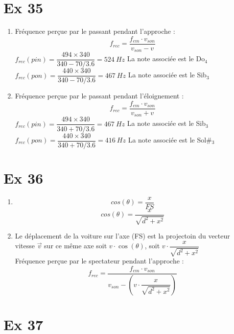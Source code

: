 \documentclass[a4paper,11pt,fleqn]{article}%
\begin{document}
\maketitle

\section*{Ex 35} 

\begin{enumerate}
	\item Fréquence perçue par le passant pendant l'approche : $$f_{rec} = \dfrac{f_{em}\cdot v_{son}}{v_{son}-v}$$
 $f_{rec}(pin) = \dfrac{494\times 340}{340-70/3.6} = \SI{524}{Hz}$ La note associée est le Do$_4$\\
$f_{rec}(pon) = \dfrac{440\times 340}{340-70/3.6} = \SI{467}{Hz}$ La note associée est le Sib$_3$\\
	\item Fréquence perçue par le passant pendant l'éloignement : $$f_{rec} = \dfrac{f_{em}\cdot v_{son}}{v_{son}+v}$$
 $f_{rec}(pin) = \dfrac{494\times 340}{340+70/3.6} = \SI{467}{Hz}$ La note associée est le Sib$_3$\\
$f_{rec}(pon) = \dfrac{440\times 340}{340+70/3.6} = \SI{416}{Hz}$ La note associée est le Sol\#$_3$\\
\end{enumerate}

\section*{Ex 36}

\begin{enumerate}
	\item $$cos(\theta) = \dfrac{x}{FS}$$ $$cos(\theta) = \dfrac{x}{\sqrt{d^2 + x^2}} $$
	\item Le déplacement de la voiture sur l'axe (FS) est la projectoin du vecteur vitesse $\vec{v}$ sur ce même axe soit $v\cdot \cos(\theta)$, soit $v\cdot \dfrac{x}{\sqrt{d^2 + x^2}}$\\
	Fréquence perçue par le spectateur pendant l'approche : $$f_{rec} = \dfrac{f_{em}\cdot v_{son}}{v_{son}-(v\cdot \dfrac{x}{\sqrt{d^2 + x^2}})}$$
\end{enumerate}


\section*{Ex 37}
\end{document}
